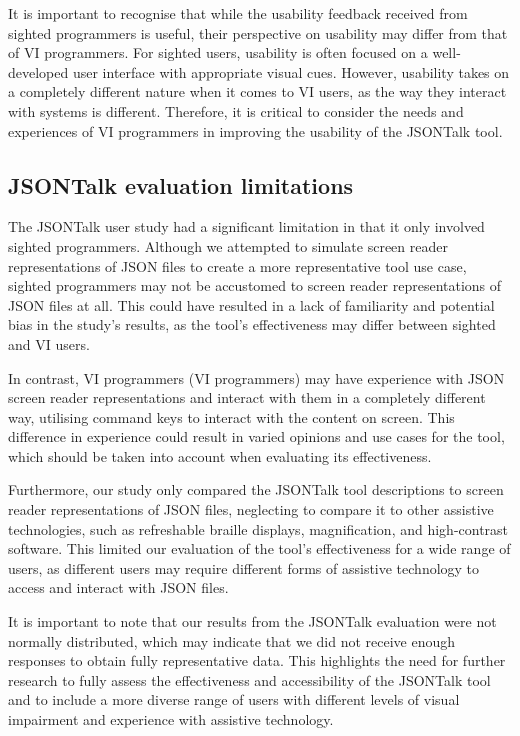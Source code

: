 \documentclass{l4proj}
\begin{document}
It is important to recognise that while the usability feedback received from sighted programmers is useful, their perspective on usability may differ from that of VI programmers. For sighted users, usability is often focused on a well-developed user interface with appropriate visual cues. However, usability takes on a completely different nature when it comes to VI users, as the way they interact with systems is different. Therefore, it is critical to consider the needs and experiences of VI programmers in improving the usability of the JSONTalk tool.


\subsection{JSONTalk evaluation limitations}

The JSONTalk user study had a significant limitation in that it only involved sighted programmers. Although we attempted to simulate screen reader representations of JSON files to create a more representative tool use case, sighted programmers may not be accustomed to screen reader representations of JSON files at all. This could have resulted in a lack of familiarity and potential bias in the study's results, as the tool's effectiveness may differ between sighted and VI users.

In contrast, VI programmers (VI programmers) may have experience with JSON screen reader representations and interact with them in a completely different way, utilising command keys to interact with the content on screen. This difference in experience could result in varied opinions and use cases for the tool, which should be taken into account when evaluating its effectiveness.

Furthermore, our study only compared the JSONTalk tool descriptions to screen reader representations of JSON files, neglecting to compare it to other assistive technologies, such as refreshable braille displays, magnification, and high-contrast software. This limited our evaluation of the tool's effectiveness for a wide range of users, as different users may require different forms of assistive technology to access and interact with JSON files.

It is important to note that our results from the JSONTalk evaluation were not normally distributed, which may indicate that we did not receive enough responses to obtain fully representative data. This highlights the need for further research to fully assess the effectiveness and accessibility of the JSONTalk tool and to include a more diverse range of users with different levels of visual impairment and experience with assistive technology.
\end{document}
